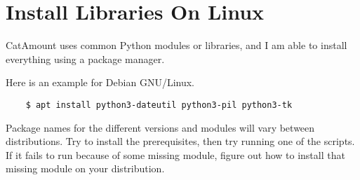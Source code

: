 \chapter{Install Libraries On Linux}
\hypertarget{linux-install-libraries}{}

CatAmount uses common Python modules or libraries, and I am able
to install everything using a package manager.

Here is an example for Debian GNU/Linux.

\begin{verbatim}
    $ apt install python3-dateutil python3-pil python3-tk
\end{verbatim}

Package names for the different versions and modules will vary between
distributions. Try to install the prerequisites, then try running one
of the scripts. If it fails to run because of some missing module, figure
out how to install that missing module on your distribution.

